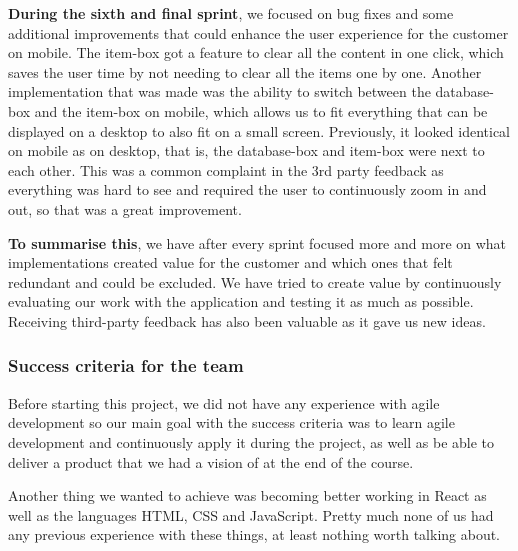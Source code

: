 \textbf{During the sixth and final sprint}, we focused on bug fixes and some additional improvements that could enhance the user experience for the customer on mobile. The item-box got a feature to clear all the content in one click, which saves the user time by not needing to clear all the items one by one. Another implementation that was made was the ability to switch between the database-box and the item-box on mobile, which allows us to fit everything that can be displayed on a desktop to also fit on a small screen. Previously, it looked identical on mobile as on desktop, that is, the database-box and item-box were next to each other. This was a common complaint in the 3rd party feedback as everything was hard to see and required the user to continuously zoom in and out, so that was a great improvement. 

\textbf{To summarise this}, we have after every sprint focused more and more on what implementations created value for the customer and which ones that felt redundant and could be excluded. We have tried to create value by continuously evaluating our work with the application and testing it as much as possible. Receiving third-party feedback has also been valuable as it gave us new ideas. 

\subsubsection{Success criteria for the team}
Before starting this project, we did not have any experience with agile development so our main goal with the success criteria was to learn agile development and continuously apply it during the project, as well as be able to deliver a product that we had a vision of at the end of the course.  

Another thing we wanted to achieve was becoming better working in React\cite{React} as well as the languages HTML\cite{HTML}, CSS\cite{CSS} and JavaScript\cite{JavaScript}. Pretty much none of us had any previous experience with these things, at least nothing worth talking about.

